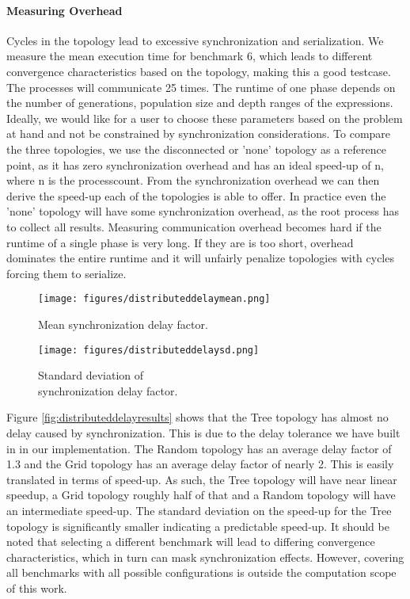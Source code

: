 \paragraph{Measuring Overhead}
Cycles in the topology lead to excessive synchronization and serialization. We measure the mean execution time for benchmark 6, which leads to different convergence characteristics based on the topology, making this a good testcase. The processes will communicate 25 times. 
The runtime of one phase depends on the number of generations, population size and depth ranges of the expressions. 
Ideally, we would like for a user to choose these parameters based on the problem at hand and not be constrained by synchronization considerations. To compare the three topologies, we use the disconnected or 'none' topology as a reference point, as it has zero synchronization overhead and has an ideal speed-up of n, where n is the processcount. From the synchronization overhead we can then derive the speed-up each of the topologies is able to offer. In practice even the 'none' topology will have some synchronization overhead, as the root process has to collect all results.
Measuring communication overhead becomes hard if the runtime of a single phase is very long. If they are is too short, overhead dominates the entire runtime and it will unfairly penalize topologies with cycles forcing them to serialize. 

\begin{figure*}
    \centering
    \begin{subfigure}{0.5\textwidth}
    \centering
        \texttt{[image: figures/distributeddelaymean.png]}
        \caption{Mean synchronization delay factor.}
    \end{subfigure}%
    \begin{subfigure}{0.5\textwidth}
    \centering
        \texttt{[image: figures/distributeddelaysd.png]}
        \caption{Standard deviation of \\synchronization delay factor.}
    \end{subfigure}
    \caption{Synchronization overhead introduced by topologies.}
    \label{fig:distributeddelayresults}
    \end{figure*}
    
Figure \ref{fig:distributeddelayresults} shows that the Tree topology has almost no delay caused by synchronization. This is due to the delay tolerance we have built in in our implementation. The Random topology has an average delay factor of 1.3 and the Grid topology has an average delay factor of nearly 2. This is easily translated in terms of speed-up. As such, the Tree topology will have near linear speedup, a Grid topology roughly half of that and a Random topology will have an intermediate speed-up. The standard deviation on the speed-up for the Tree topology is significantly smaller indicating a predictable speed-up. 
It should be noted that selecting a different benchmark will lead to differing convergence characteristics, which in turn can mask synchronization effects. However, covering all benchmarks with all possible configurations is outside the computation scope of this work. 

